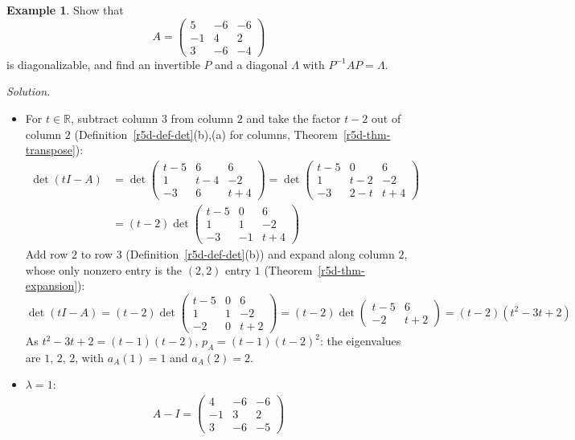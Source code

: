 \documentclass[12pt]{article}
\newcommand{\R}{\mathbb R}
\theoremstyle{definition}
\newtheorem{example}[theorem]{Example}
\begin{document}
\begin{example}\label{r7-exm-diagonalize}
Show that
\[
A=\begin{pmatrix}5&-6&-6\\-1&4&2\\3&-6&-4\end{pmatrix}
\]
is diagonalizable, and find an invertible \(P\) and a diagonal \(\Lambda\) with \(P^{-1}AP=\Lambda\).

\textit{Solution.}
\begin{itemize}
\item For \(t\in\R\), subtract column \(3\) from column \(2\) and take the factor \(t-2\) out of column \(2\)
(Definition~\ref{r5d-def-det}(b),(a) for columns, Theorem~\ref{r5d-thm-transpose}):
\[
\begin{aligned}
\det(tI-A)&=\det\begin{pmatrix}t-5&6&6\\1&t-4&-2\\-3&6&t+4\end{pmatrix}
=\det\begin{pmatrix}t-5&0&6\\1&t-2&-2\\-3&2-t&t+4\end{pmatrix}\\
&=(t-2)\det\begin{pmatrix}t-5&0&6\\1&1&-2\\-3&-1&t+4\end{pmatrix}
\end{aligned}
\]
Add row \(2\) to row \(3\) (Definition~\ref{r5d-def-det}(b)) and expand along column \(2\), whose only nonzero entry is
the \((2,2)\) entry \(1\) (Theorem~\ref{r5d-thm-expansion}):
\[
\det(tI-A)=(t-2)\det\begin{pmatrix}t-5&0&6\\1&1&-2\\-2&0&t+2\end{pmatrix}
=(t-2)\det\begin{pmatrix}t-5&6\\-2&t+2\end{pmatrix}=(t-2)(t^2-3t+2)
\]
As \(t^2-3t+2=(t-1)(t-2)\), \(p_A=(t-1)(t-2)^2\): the eigenvalues are \(1\), \(2\), \(2\), with \(a_A(1)=1\) and
\(a_A(2)=2\).
\item \(\lambda=1\):
\[
\begin{gathered}
A-I=\begin{pmatrix}4&-6&-6\\-1&3&2\\3&-6&-5\end{pmatrix}

\end{gathered}\]
\end{itemize}
\end{example}
\end{document}
